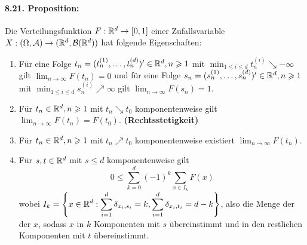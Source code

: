 \documentclass[11pt]{report}
\begin{document}
\paragraph{8.21. Proposition:}Die Verteilungsfunktion  $F:\mathbb{R}^d\to[0,1]$ einer Zufallsvariable $X:(\Omega,\mathcal{A})\to(\mathbb{R}^d,\mathcal{B}(\mathbb{R}^d))$ hat folgende Eigenschaften:
\begin{enumerate}[label=(\roman*)]
    \item F\"ur eine Folge $t_n=(t_n^{(1)},\hdots,t_n^{(d)})'\in\mathbb{R}^d,n\geqslant1$ mit $\displaystyle\min_{1\leq i\leq d}t_n^{(i)}\searrow-\infty$ gilt $\displaystyle\lim_{n\to\infty}F(t_n)=0$
    und f\"ur eine Folge $s_n=(s_n^{(1)},\hdots,s_n^{(d)})'\in\mathbb{R}^d,n\geqslant1$ mit $\displaystyle\min_{1\leq i\leq d}s_n^{(i)}\nearrow\infty$ gilt $\displaystyle\lim_{n\to\infty}F(s_n)=1$.
    \item F\"ur $t_n\in\mathbb{R}^d,n\geqslant1$ mit $t_n\searrow t_0$ komponentenweise gilt $\displaystyle\lim_{n\to\infty}F(t_n)=F(t_0)$. \textbf{(Rechtsstetigkeit)}
    \item F\"ur $t_n\in\mathbb{R}^d,n\geqslant1$ mit $t_n\nearrow t_0$ komponentenweise existiert $\displaystyle\lim_{n\to\infty}F(t_n)$.
    \item F\"ur $s,t\in\mathbb{R}^d$ mit $s\leq d$ komponentenweise gilt
    $$0\leq\sum_{k=0}^d(-1)^k\sum_{x\in I_k}F(x)$$
    wobei $I_k=\displaystyle\left\{x\in\mathbb{R}^d:\sum_{i=1}^d\delta_{x_i,s_i}=k,\sum_{i=1}^d\delta_{x_i,t_i}=d-k\right\}$, also die Menge der der $x$, sodass $x$ in $k$ Komponenten mit $s$ \"ubereinstimmt und in den restlichen Komponenten mit $t$ \"ubereinstimmt.
\end{enumerate}
\end{document}
